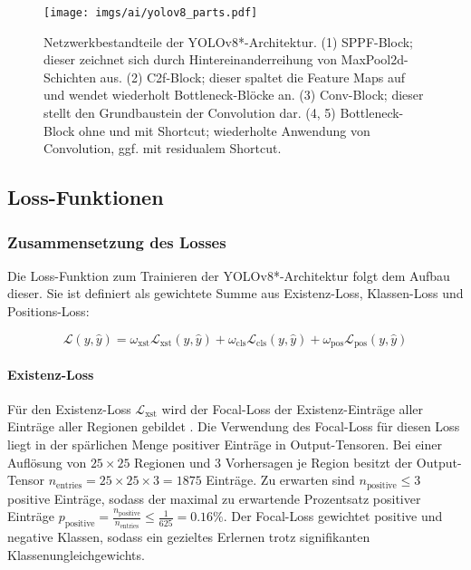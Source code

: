 \begin{figure}
    \centering
    \texttt{[image: imgs/ai/yolov8\_parts.pdf]}
    \caption{Netzwerkbestandteile der YOLOv8*-Architektur. (1) SPPF-Block; dieser zeichnet sich durch Hintereinanderreihung von MaxPool2d-Schichten aus. (2) C2f-Block; dieser spaltet die Feature Maps auf und wendet wiederholt Bottleneck-Blöcke an. (3) Conv-Block; dieser stellt den Grundbaustein der Convolution dar. (4, 5) Bottleneck-Block ohne und mit Shortcut; wiederholte Anwendung von Convolution, ggf. mit residualem Shortcut.}
    \label{img:yolov8_parts}
\end{figure}

\subsection{Loss-Funktionen}
\label{sec:losses}


\subsubsection{Zusammensetzung des Losses}

Die Loss-Funktion zum Trainieren der YOLOv8*-Architektur folgt dem Aufbau dieser. Sie ist definiert als gewichtete Summe aus Existenz-Loss, Klassen-Loss und Positions-Loss:

\[ \mathcal{L}(y, \hat{y}) = \omega_\text{xst} \mathcal{L}_\text{xst}(y, \hat{y}) + \omega_\text{cls} \mathcal{L}_\text{cls}(y, \hat{y}) + \omega_\text{pos} \mathcal{L}_\text{pos}(y, \hat{y}) \]

\paragraph{Existenz-Loss}

Für den Existenz-Loss $\mathcal{L}_\text{xst}$ wird der Focal-Loss der Existenz-Einträge aller Einträge aller Regionen gebildet \cite{focal_loss}. Die Verwendung des Focal-Loss für diesen Loss liegt in der spärlichen Menge positiver Einträge in Output-Tensoren. Bei einer Auflösung von $25 \times 25$ Regionen und 3 Vorhersagen je Region besitzt der Output-Tensor $n_\text{entries} = 25 \times 25 \times 3 = 1875$ Einträge. Zu erwarten sind $ n_\text{positive} \leq 3 $ positive Einträge, sodass der maximal zu erwartende Prozentsatz positiver Einträge $p_\text{positive} = \frac{n_\text{positive}}{n_\text{entries}} \leq \frac{1}{625} = 0.16\% $. Der Focal-Loss gewichtet positive und negative Klassen, sodass ein gezieltes Erlernen trotz signifikanten Klassenungleichgewichts.

